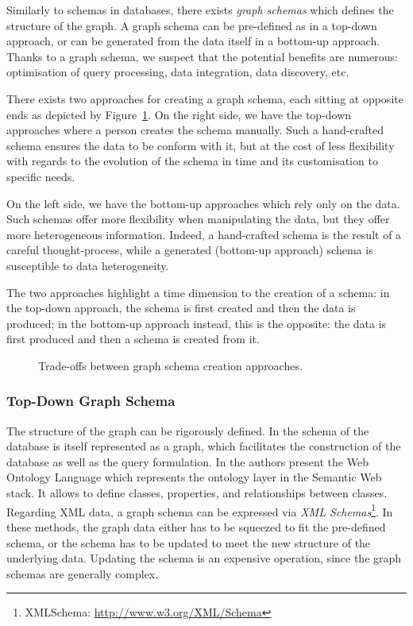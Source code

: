 Similarly to schemas in databases, there exists \emph{graph schemas} which defines the structure of the graph. A graph schema can be pre-defined as in a top-down approach, or can be generated from the data itself in a bottom-up approach. Thanks to a graph schema, we suspect that the potential benefits are numerous: optimisation of query processing, data integration, data discovery, etc.

There exists two approaches for creating a graph schema, each sitting at opposite ends as depicted by Figure~\ref{fig:introduction:schema-tradeoffs}. On the right side, we have the top-down approaches where a person creates the schema manually. Such a hand-crafted schema ensures the data to be conform with it, but at the cost of less flexibility with regards to the evolution of the schema in time and its customisation to specific needs.

On the left side, we have the bottom-up approaches which rely only on the data. Such schemas offer more flexibility when manipulating the data, but they offer more heterogeneous information.
Indeed, a hand-crafted schema is the result of a careful thought-process, while a generated (bottom-up approach) schema is susceptible to data heterogeneity.

The two approaches highlight a time dimension to the creation of a schema: in the top-down approach, the schema is first created and then the data is produced; in the bottom-up approach instead, this is the opposite: the data is first produced and then a schema is created from it.

\begin{figure}
	\centering
	\resizebox{.6\textwidth}{!}{
		
	}
	\caption{Trade-offs between graph schema creation approaches.}
	\label{fig:introduction:schema-tradeoffs}
\end{figure}

\subsubsection{Top-Down Graph Schema}

The structure of the graph can be rigorously defined. In \cite{kunii1983graph} the schema of the database is itself represented as a graph, which facilitates the construction of the database as well as the query formulation. In \cite{antoniou2004web} the authors present the Web Ontology Language which represents the ontology layer in the Semantic Web stack. It allows to define classes, properties, and relationships between classes. Regarding XML data, a graph schema can be expressed via \emph{XML Schemas}\footnote{XMLSchema: \url{http://www.w3.org/XML/Schema}}. In these methods, the graph data either has to be squeezed to fit the pre-defined schema, or the schema has to be updated to meet the new structure of the underlying data. Updating the schema is an expensive operation, since the graph schemas are generally complex.

